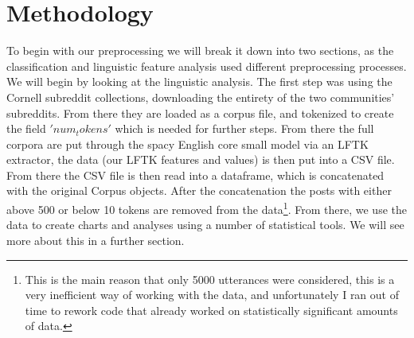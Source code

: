 \documentclass[11pt]{article}
\begin{document}
\section{Methodology}



To begin with our preprocessing we will break it down into two sections, as the classification and linguistic feature analysis used different preprocessing processes. We will begin by looking at the linguistic analysis. The first step was using the Cornell subreddit collections, downloading the entirety of the two communities' subreddits. From there they are loaded as a corpus file, and tokenized to create the field $'num_tokens'$ which is needed for further steps. From there the full corpora are put through the spacy English core small model via an LFTK extractor, the data (our LFTK features and values) is then put into a CSV file. From there the CSV file is then read into a dataframe, which is concatenated with the original Corpus objects. After the concatenation the posts with either above 500 or below 10 tokens are removed from the data\footnote{This is the main reason that only 5000 utterances were considered, this is a very inefficient way of working with the data, and unfortunately I ran out of time to rework code that already worked on statistically significant amounts of data. }. From there, we use the data to create charts and analyses using a number of statistical tools. We will see more about this in a further section.
\end{document}
